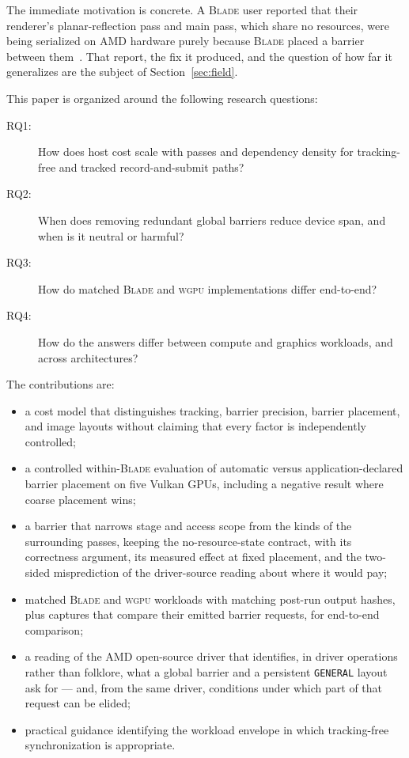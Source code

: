 \documentclass[10pt,twocolumn]{article}
\newcommand{\blade}{\textsc{Blade}}
\newcommand{\wgpu}{\textsc{wgpu}}
\begin{document}
The immediate motivation is concrete. A \blade{} user reported that their
renderer's planar-reflection pass and main pass, which share no resources, were
being serialized on AMD hardware purely because \blade{} placed a barrier
between them~\cite{blade-issue-343}. That report, the fix it produced, and the
question of how far it generalizes are the subject of Section~\ref{sec:field}.

This paper is organized around the following research questions:

\begin{description}
  \item[RQ1:] How does host cost scale with passes and dependency density for
  tracking-free and tracked record-and-submit paths?
  \item[RQ2:] When does removing redundant global barriers reduce device span,
  and when is it neutral or harmful?
  \item[RQ3:] How do matched \blade{} and \wgpu{} implementations differ
  end-to-end?
  \item[RQ4:] How do the answers differ between compute and graphics workloads,
  and across architectures?
\end{description}

The contributions are:

\begin{itemize}
  \item a cost model that distinguishes tracking, barrier precision, barrier
  placement, and image layouts without claiming that every factor is
  independently controlled;
  \item a controlled within-\blade{} evaluation of automatic versus
  application-declared barrier placement on five Vulkan GPUs, including a negative
  result where coarse placement wins;
  \item a barrier that narrows stage and access scope from the kinds of the
  surrounding passes, keeping the no-resource-state contract, with its
  correctness argument, its measured effect at fixed placement, and the
  two-sided misprediction of the driver-source reading about where it would
  pay;
  \item matched \blade{} and \wgpu{} workloads with matching post-run output
  hashes, plus captures that compare their emitted barrier requests, for
  end-to-end comparison;
  \item a reading of the AMD open-source driver that identifies, in driver
  operations rather than folklore, what a global barrier and a persistent
  \texttt{GENERAL} layout ask for --- and, from the same driver, conditions
  under which part of that request can be elided;
  \item practical guidance identifying the workload envelope in which
  tracking-free synchronization is appropriate.
\end{itemize}
\end{document}
